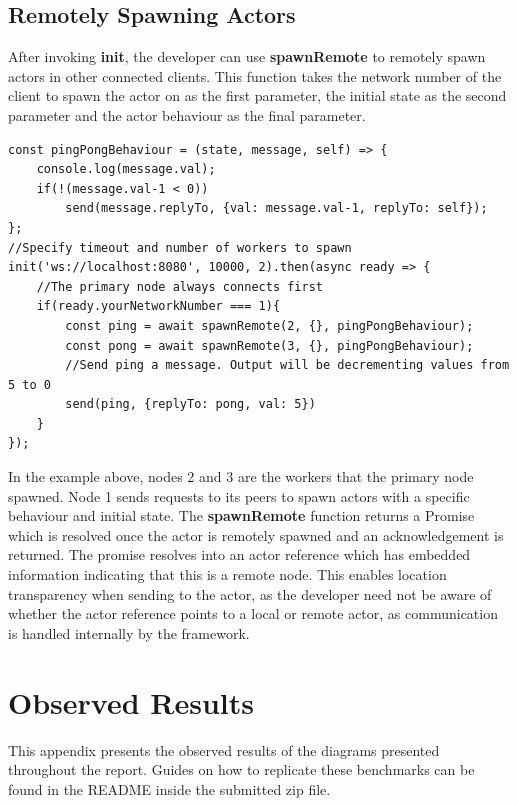 \documentclass[oneside]{um-fict}
\begin{document}
\section{Remotely Spawning Actors}
After invoking \textbf{init}, the developer can use \textbf{spawnRemote} to remotely spawn actors in other connected clients. This function takes the network number of the client to spawn the actor on as the first parameter, the initial state as the second parameter and the actor behaviour as the final parameter.
\newpage
\begin{lstlisting}
const pingPongBehaviour = (state, message, self) => {
    console.log(message.val);
    if(!(message.val-1 < 0))
        send(message.replyTo, {val: message.val-1, replyTo: self});
};
//Specify timeout and number of workers to spawn
init('ws://localhost:8080', 10000, 2).then(async ready => {
    //The primary node always connects first
    if(ready.yourNetworkNumber === 1){
        const ping = await spawnRemote(2, {}, pingPongBehaviour);
        const pong = await spawnRemote(3, {}, pingPongBehaviour);
        //Send ping a message. Output will be decrementing values from 5 to 0
        send(ping, {replyTo: pong, val: 5})
    }
});
\end{lstlisting}
In the example above, nodes 2 and 3 are the workers that the primary node spawned. Node 1 sends requests to its peers to spawn actors with a specific behaviour and initial state. The \textbf{spawnRemote} function returns a Promise which is resolved once the actor is remotely spawned and an acknowledgement is returned. The promise resolves into an actor reference which has embedded information indicating that this is a remote node. This enables location transparency when sending to the actor, as the developer need not be aware of whether the actor reference points to a local or remote actor, as communication is handled internally by the framework.

\chapter{Observed Results}\label{appendix:results}
This appendix presents the observed results of the diagrams presented throughout the report. Guides on how to replicate these benchmarks can be found in the README inside the submitted zip file.
\end{document}

